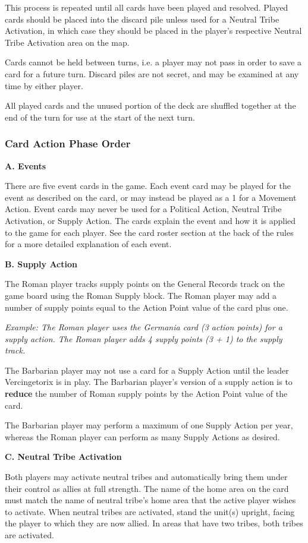 This process is repeated until all cards have been played and resolved. Played cards should be placed into the discard pile unless used for a Neutral Tribe Activation, in which case they should be placed in the player's respective Neutral Tribe Activation area on the map.

Cards cannot be held between turns, i.e. a player may not pass in order to save a card for a future turn. Discard piles are not secret, and may be examined at any time by either player.

All played cards and the unused portion of the deck are shuffled together at the end of the turn for use at the start of the next turn.

\subsubsection{Card Action Phase Order}

\textbf{A. Events}
\par
There are five event cards in the game. Each event card may be played for the event as described on the card, or may instead be played as a 1 for a Movement Action. Event cards may never be used for a Political Action, Neutral Tribe Activation, or Supply Action. The cards explain the event and how it is applied to the game for each player. See the card roster section at the back of the rules for a more detailed explanation of each event.

\textbf{B. Supply Action}
\par
The Roman player tracks supply points on the General Records track on the game board using the Roman Supply block. The Roman player may add a number of supply points equal to the Action Point value of the card plus one.

\textit{Example: The Roman player uses the Germania card (3 action points) for a supply action. The Roman player adds 4 supply points (3 + 1) to the supply track.}

The Barbarian player may not use a card for a Supply Action until the leader Vercingetorix is in play. The Barbarian player's version of a supply action is to \textbf{reduce} the number of Roman supply points by the Action Point value of the card.

The Barbarian player may perform a maximum of one Supply Action per year, whereas the Roman player can perform as many Supply Actions as desired.

\textbf{C. Neutral Tribe Activation}
\par
Both players may activate neutral tribes and automatically bring them under their control as allies at full strength. The name of the home area on the card must match the name of neutral tribe's home area that the active player wishes to activate. When neutral tribes are activated, stand the unit(s) upright, facing the player to which they are now allied. In areas that have two tribes, both tribes are activated.

